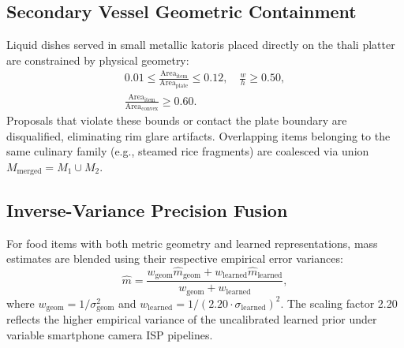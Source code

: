 \documentclass[conference]{IEEEtran}
\begin{document}
\subsection{Secondary Vessel Geometric Containment}
Liquid dishes served in small metallic katoris placed directly on the thali platter are constrained by physical geometry:
\begin{equation}
\begin{gathered}
0.01 \le \frac{\mathrm{Area}_{\mathrm{item}}}{\mathrm{Area}_{\mathrm{plate}}} \le 0.12, \quad \frac{w}{h} \ge 0.50, \\
\frac{\mathrm{Area}_{\mathrm{item}}}{\mathrm{Area}_{\mathrm{convex}}} \ge 0.60.
\end{gathered}
\end{equation}
Proposals that violate these bounds or contact the plate boundary are disqualified, eliminating rim glare artifacts. Overlapping items belonging to the same culinary family (e.g., steamed rice fragments) are coalesced via union $M_{\mathrm{merged}} = M_1 \cup M_2$.

\subsection{Inverse-Variance Precision Fusion}
For food items with both metric geometry and learned representations, mass estimates are blended using their respective empirical error variances:
\begin{equation}
\hat{m} = \frac{w_{\mathrm{geom}} \hat{m}_{\mathrm{geom}} + w_{\mathrm{learned}} \hat{m}_{\mathrm{learned}}}{w_{\mathrm{geom}} + w_{\mathrm{learned}}},
\end{equation}
where $w_{\mathrm{geom}} = 1/\sigma_{\mathrm{geom}}^2$ and $w_{\mathrm{learned}} = 1/(2.20 \cdot \sigma_{\mathrm{learned}})^2$. The scaling factor 2.20 reflects the higher empirical variance of the uncalibrated learned prior under variable smartphone camera ISP pipelines.
\end{document}

